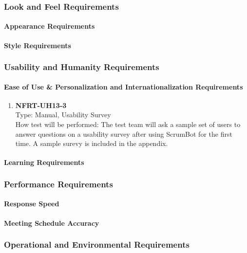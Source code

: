 \documentclass[12pt, titlepage]{article}
\begin{document}
\subsubsection{Look and Feel Requirements}
\paragraph{Appearance Requirements}


\paragraph{Style Requirements}


\subsubsection{Usability and Humanity Requirements}
\paragraph{Ease of Use \& Personalization and Internationalization Requirements}
\begin{enumerate}
    \item{\textbf{NFRT-UH13-3}}\\
    Type: Manual, Usability Survey\\
    How test will be performed: The test team will ask a sample set of users to answer questions on a usability survey after using ScrumBot for the first time. A sample surevy is included in the appendix.
\end{enumerate}

\paragraph{Learning Requirements}


\subsubsection{Performance Requirements}
\paragraph{Response Speed}


\paragraph{Meeting Schedule Accuracy}


\subsubsection{Operational and Environmental Requirements}
\end{document}
